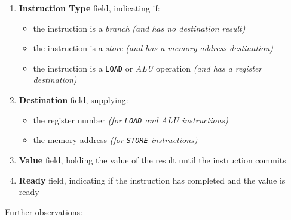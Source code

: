 \documentclass[english]{article}
\begin{document}
\begin{enumerate}
  \item \textbf{Instruction Type} field, indicating if:
        \begin{itemize}
          \item the instruction is a \textit{branch} \textit{(and has no destination result)}
          \item the instruction is a \textit{store} \textit{(and has a memory address destination)}
          \item the instruction is a \texttt{LOAD} or \textit{ALU} operation \textit{(and has a register destination)}
        \end{itemize}
  \item \textbf{Destination} field, supplying:
        \begin{itemize}
          \item the register number \textit{(for \texttt{LOAD} and \textit{ALU} instructions)}
          \item the memory address \textit{(for \texttt{STORE} instructions)}
        \end{itemize}
  \item \textbf{Value} field, holding the value of the result until the instruction commits
  \item \textbf{Ready} field, indicating if the instruction has completed and the value is ready
\end{enumerate}

\bigskip
Further observations:
\end{document}
